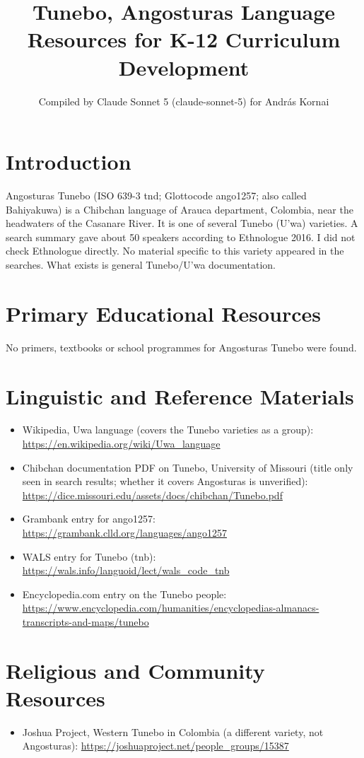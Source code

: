 \documentclass[12pt]{article}
\title{Tunebo, Angosturas Language Resources for K-12 Curriculum Development}
\author{Compiled by Claude Sonnet 5 (claude-sonnet-5) for Andr\'as Kornai}
\date{}
\begin{document}
\maketitle

\section{Introduction}
Angosturas Tunebo (ISO 639-3 tnd; Glottocode ango1257; also called Bahiyakuwa) is a Chibchan language of Arauca department, Colombia, near the headwaters of the Casanare River. It is one of several Tunebo (U'wa) varieties. A search summary gave about 50 speakers according to Ethnologue 2016. I did not check Ethnologue directly. No material specific to this variety appeared in the searches. What exists is general Tunebo/U'wa documentation.

\section{Primary Educational Resources}
No primers, textbooks or school programmes for Angosturas Tunebo were found.

\section{Linguistic and Reference Materials}
\begin{itemize}
\item Wikipedia, Uwa language (covers the Tunebo varieties as a group): \url{https://en.wikipedia.org/wiki/Uwa_language}
\item Chibchan documentation PDF on Tunebo, University of Missouri (title only seen in search results; whether it covers Angosturas is unverified): \url{https://dice.missouri.edu/assets/docs/chibchan/Tunebo.pdf}
\item Grambank entry for ango1257: \url{https://grambank.clld.org/languages/ango1257}
\item WALS entry for Tunebo (tnb): \url{https://wals.info/languoid/lect/wals_code_tnb}
\item Encyclopedia.com entry on the Tunebo people: \url{https://www.encyclopedia.com/humanities/encyclopedias-almanacs-transcripts-and-maps/tunebo}
\end{itemize}

\section{Religious and Community Resources}
\begin{itemize}
\item Joshua Project, Western Tunebo in Colombia (a different variety, not Angosturas): \url{https://joshuaproject.net/people_groups/15387}
\end{itemize}
\end{document}

